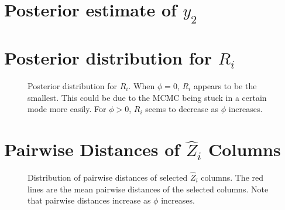 \documentclass[11pt]{article} %
\def\imscale{.5}
\begin{document}
\newpage
\section{Posterior estimate of $y_2$}
\begin{figure}[H]
  \begin{center}  %
    \imgtemplate{y2.pdf}{\imscale}
  \end{center}
  \caption{}
  \label{fig:y2est}
\end{figure}



\newpage
\section{Posterior distribution for $R_i$}
\begin{figure}[H]
  \begin{center}  %
  \end{center}
  \caption{Posterior distribution for $R_i$. When $\phi=0$, $R_i$ appears
  to be the smallest. This could be due to the MCMC being stuck in a certain
  mode more easily. For $\phi > 0$, $R_i$ seems to decrease as $\phi$ increases.}
  \label{fig:W-post}
\end{figure}

\newpage
\section{Pairwise Distances of $\hat Z_i$ Columns}
\begin{figure}[H]
  \begin{center}  %
  \end{center}
  \caption{Distribution of pairwise distances of selected $\hat Z_i$ columns.
  The red lines are the mean pairwise distances of the selected columns.
  Note that pairwise distances increase as $\phi$ increases.}
  \label{fig:W-post}
\end{figure}
  
\end{document}
